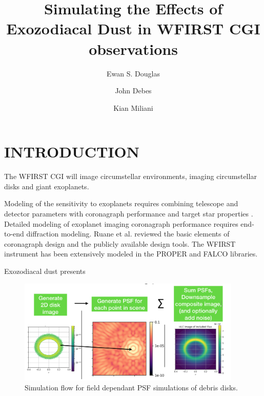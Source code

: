 \documentclass[]{spie}  %
\title{Simulating the Effects of Exozodiacal Dust in WFIRST CGI observations}
\author[a]{Ewan S. Douglas}
\author[b]{John Debes}
\author[a]{Kian Miliani}
\affil[a]{University of Arizona, Tucson, AZ, USA}
\affil[b]{STScI, Baltimore, MD, USA}
\begin{document}
 
\maketitle

\begin{abstract}

\end{abstract}


\section{INTRODUCTION}
The \gls{WFIRST} \gls{CGI}\cite{spergel_wide-field_2015,noecker_coronagraph_2016,douglas_wfirst_2018,kasdin_wfirst_2018} will image circumstellar environments, imaging circumstellar disks\cite{schneider_quick_2014,schneider_detection_2016} and giant exoplanets\cite{marley_quick_2014,ygouf_data_2016-1,bailey_lessons_2018}.

Modeling of the sensitivity to exoplanets requires combining telescope and detector parameters with coronagraph performance and target star properties \cite{nemati_sensitivity_2017,savransky_exosims_2018}.
Detailed modeling of exoplanet imaging coronagraph performance requires end-to-end diffraction modeling. Ruane et al.\cite{ruane_review_2018} reviewed the basic elements of coronagraph design and the publicly available design tools.
The \gls{WFIRST} instrument has been extensively modeled in the PROPER\cite{krist_overview_2015,krist_wfirst_2017,krist_wfirst_2018,zhou_high_2018} and FALCO\cite{riggs_fast_2018,sidick_fast_2018} libraries.



\label{sec:intro}  %
Exozodiacal dust presents 
\begin{figure}[htbp]
    \centering
    \includegraphics[width=0.95\textwidth]{flow.png}
    \caption{Simulation flow for field dependant PSF simulations of debris disks.}
    \label{fig:flow}
\end{figure}
\end{document}
